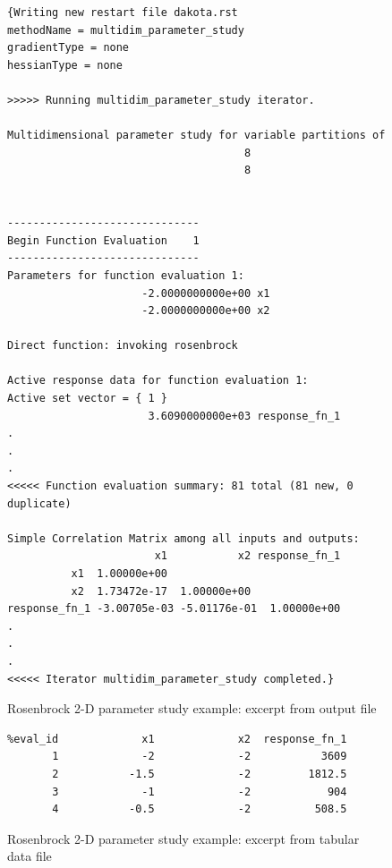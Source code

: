 \begin{figure}[ht!]
  \centering
  \begin{bigbox}
    \begin{small}
      \begin{verbatim}
{Writing new restart file dakota.rst
methodName = multidim_parameter_study
gradientType = none
hessianType = none

>>>>> Running multidim_parameter_study iterator.

Multidimensional parameter study for variable partitions of
                                     8
                                     8


------------------------------
Begin Function Evaluation    1
------------------------------
Parameters for function evaluation 1:
                     -2.0000000000e+00 x1
                     -2.0000000000e+00 x2

Direct function: invoking rosenbrock 

Active response data for function evaluation 1:
Active set vector = { 1 }
                      3.6090000000e+03 response_fn_1
.
.
.
<<<<< Function evaluation summary: 81 total (81 new, 0 duplicate)

Simple Correlation Matrix among all inputs and outputs:
                       x1           x2 response_fn_1 
          x1  1.00000e+00 
          x2  1.73472e-17  1.00000e+00 
response_fn_1 -3.00705e-03 -5.01176e-01  1.00000e+00 
. 
.
.
<<<<< Iterator multidim_parameter_study completed.}
\end{verbatim}
    \end{small}
  \end{bigbox}
\caption{Rosenbrock 2-D parameter study example: excerpt from output file}
\label{tutorial:quickstart:rosenbrock_multidim:output}
\end{figure}


\begin{figure}[ht!]
  \centering
  \begin{bigbox}
    \begin{small}
      \begin{verbatim}
%eval_id             x1             x2  response_fn_1 
       1             -2             -2           3609 
       2           -1.5             -2         1812.5 
       3             -1             -2            904 
       4           -0.5             -2          508.5 
\end{verbatim}
    \end{small}
  \end{bigbox}
\label{tutorial:quickstart:rosenbrock_multidim:dat}
\caption{Rosenbrock 2-D parameter study example: excerpt from tabular data file}
\end{figure}


